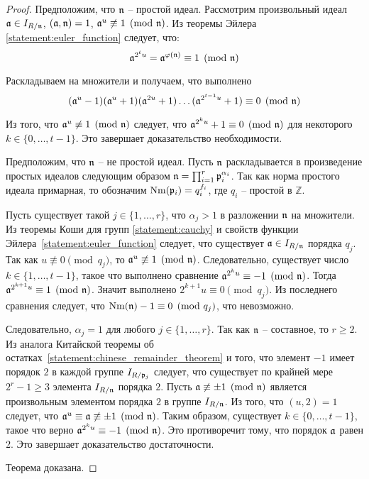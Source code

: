 \documentclass[_00_dissertation.tex]{subfiles}
\begin{document}
\begin{proof}
    Предположим, что $\mathfrak{n}$ -- простой идеал.
    Рассмотрим произвольный идеал $\mathfrak{a} \in I_{R/\mathfrak{n}}$, $(\mathfrak{a}, \mathfrak{n}) = 1$, $\mathfrak{a}^u \not\equiv 1 \pmod{\mathfrak{n}}$.
    Из теоремы Эйлера \ref{statement:euler_function} следует, что:
    \begin{equation*}
        \mathfrak{a}^{2^{t} u} = \mathfrak{a}^{\varphi(\mathfrak{n})} \equiv 1 \pmod{\mathfrak{n}}
    \end{equation*}

    Раскладываем на множители и получаем, что выполнено
    \begin{equation*}
        (\mathfrak{a}^{u} - 1)(\mathfrak{a}^{u} + 1)(\mathfrak{a}^{2u} + 1)\dots(\mathfrak{a}^{2^{t-1}u} + 1) \equiv 0 \pmod{\mathfrak{n}}
    \end{equation*}

    Из того, что $\mathfrak{a}^{u} \not\equiv 1 \pmod{\mathfrak{n}}$ следует, что $\mathfrak{a}^{2^{k}u} + 1 \equiv 0 \pmod{\mathfrak{n}}$ для некоторого $k\in \{0, \dots, t-1\}$.
    Это завершает доказательство необходимости.

    Предположим, что $\mathfrak{n}$ -- не простой идеал.
    Пусть $\mathfrak{n}$ раскладывается в произведение простых идеалов следующим образом $\mathfrak{n} = \prod_{i=1}^{r} \mathfrak{p}_i^{\alpha_i}$.
    Так как норма простого идеала примарная, то обозначим $\textrm{Nm}(\mathfrak{p}_i) = q_i^{f_i}$, где $q_i$ -- простой в $\mathbb{Z}$.

    Пусть существует такой $j \in \{1, \dots, r\}$, что $\alpha_j > 1$ в разложении $\mathfrak{n}$ на множители.
    Из теоремы Коши для групп \ref{statement:cauchy} и свойств функции Эйлера~\ref{statement:euler_function} следует, что существует $\mathfrak{a} \in I_{R/\mathfrak{n}}$ порядка $q_j$.
    Так как $u \not\equiv 0 \pmod{q_j}$, то $\mathfrak{a}^u \not\equiv 1 \pmod{\mathfrak{n}}$.
    Следовательно, существует число $k \in \{1, \dots, t-1\}$, такое что выполнено сравнение $\mathfrak{a}^{2^{k}u} \equiv -1 \pmod{\mathfrak{n}}$.
    Тогда $\mathfrak{a}^{2^{k+1}u} \equiv 1 \pmod{\mathfrak{n}}$.
    Значит выполнено $2^{k+1}u \equiv 0 \pmod{q_j}$.
    Из последнего сравнения следует, что $\textrm{Nm}(\mathfrak{n}) - 1 \equiv 0 \pmod{q_j}$, что невозможно.
    
    Следовательно, $\alpha_j = 1$ для любого $j \in \{1, \ldots, r\}$.
    Так как $\mathfrak{n}$ -- составное, то $r \ge 2$.
    Из аналога Китайской теоремы об остатках~\ref{statement:chinese_remainder_theorem} и того, что элемент $-1$ имеет порядок $2$ в каждой группе $I_{R/\mathfrak{p}_j}$ следует, что существует по крайней мере $2^r-1 \ge 3$ элемента $I_{R/\mathfrak{n}}$ порядка $2$.
    Пусть $\mathfrak{a} \not\equiv \pm 1 \pmod{\mathfrak{n}}$ является произвольным элементом порядка $2$ в группе $I_{R/\mathfrak{n}}$.
    Из того, что $(u, 2) = 1$ следует, что $\mathfrak{a}^u \equiv \mathfrak{a} \not\equiv \pm 1 \pmod{\mathfrak{n}}$.
    Таким образом, существует $k \in \{0,\ldots, t-1\}$, такое что верно $\mathfrak{a}^{2^{k}u} \equiv -1 \pmod{\mathfrak{n}}$.
    Это противоречит тому, что порядок $\mathfrak{a}$ равен $2$.
    Это завершает доказательство достаточности.

    Теорема доказана.
\end{proof}
\end{document}
